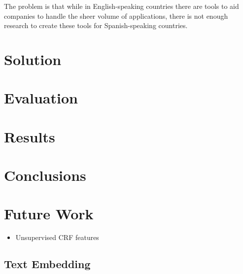 \documentclass[a4paper, conference]{ieeeconf}
\begin{document}
  \medskip
  The problem is that while in English-speaking countries there are tools to
  aid companies to handle the sheer volume of applications, there is not enough
  research to create these tools for Spanish-speaking countries.

  \section{Solution}
  \section{Evaluation}
  \section{Results}
  \section{Conclusions}
  \section{Future Work}
  \begin{itemize}
    \item Unsupervised CRF features
  \end{itemize}
  \subsection{Text Embedding}

   
\end{document}
